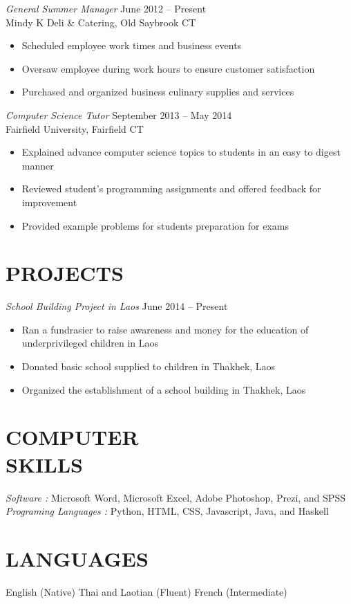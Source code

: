 \documentclass[margin, 10pt]{res}
\begin{document}
\begin{resume}
{\sl General Summer Manager} \hfill June 2012 -- Present\\
{\small{Mindy K Deli \& Catering, Old Saybrook CT}}
\begin{itemize} \itemsep -1.5pt %
  \item Scheduled employee work times and business events
  \item Oversaw employee during work hours to ensure customer satisfaction
  \item Purchased and organized business culinary supplies and services
\end{itemize}
%
{\sl Computer Science Tutor} \hfill September 2013 --  May 2014 \\
{\small{Fairfield University, Fairfield CT}}
\begin{itemize} \itemsep -1.5pt %
  \item Explained advance computer science topics to students in an easy to digest manner
  \item Reviewed student's programming assignments and offered feedback for improvement
  \item Provided example problems for students preparation for exams
\end{itemize}
\section{PROJECTS}
{\sl School Building Project in Laos} \hfill June 2014 -- Present
\begin{itemize} \itemsep -1.5pt %
  \item Ran a fundrasier to raise awareness and money for the education of underprivileged children in Laos
  \item Donated basic school supplied to children in Thakhek, Laos
  \item Organized the establishment of a school building in Thakhek, Laos
\end{itemize}
\section{COMPUTER \\ SKILLS} 
{\sl Software :} Microsoft Word, Microsoft Excel, Adobe Photoshop, Prezi, and SPSS \\
{\sl Programing Languages :} Python, HTML, CSS, Javascript, Java, and Haskell
\section{LANGUAGES}
English (Native) Thai and Laotian (Fluent) French (Intermediate) \\

\end{resume}
\end{document}
